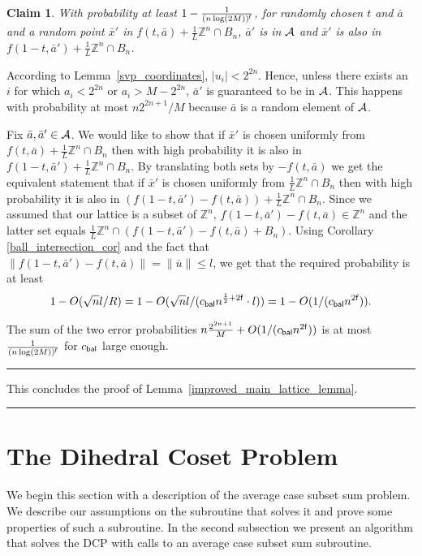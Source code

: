 \documentclass[11pt]{article}
\newtheorem{claim}[theorem]{Claim}
\newcommand{\qedsymb}{\hfill{\rule{2mm}{2mm}}}
\newenvironment{proof}{\begin{trivlist}
\item[\hspace{\labelsep}{\sl\noindent Proof:\/}]
}{\qedsymb\end{trivlist}}
\def\Z{\mathbb{Z}}
\newcommand\C[1]{{ c_{\sf {#1}} }}
\newcommand\alternate[2]{{#1}}
\begin{document}
\begin{proof}
\begin{claim}
With probability at least $1-\frac{1}{(n\log (2M))^{\sf f}}$, for randomly chosen $t$ and $\bar{a}$ and a random point
$\bar{x}'$ in $f(t,\bar{a})+\frac{1}{L}\Z^n \cap B_n$, $\bar{a}'$ is in ${\cal A}$ and $\bar{x}'$ is also in
$f(1-t,\bar{a}')+\frac{1}{L}\Z^n \cap B_n$.
\end{claim}
\begin{proof}
According to Lemma~\ref{svp_coordinates}, $|u_i| < 2^{2n}$. Hence, unless there exists an $i$ for which $a_i < 2^{2n}$
or $a_i > M-2^{2n}$, $\bar{a}'$ is guaranteed to be in ${\cal A}$. This happens with probability at most $n2^{2n+1}/M$
because $\bar{a}$ is a random element of ${\cal A}$.

Fix $\bar{a},\bar{a}' \in {\cal A}$. We would like to show that if $\bar{x}'$ is chosen uniformly from
$f(t,\bar{a})+\frac{1}{L}\Z^n \cap B_n$ then with high probability it is also in $f(1-t,\bar{a}')+\frac{1}{L}\Z^n \cap
B_n$. By translating both sets by $-f(t,\bar{a})$ we get the equivalent statement that if $\bar{x}'$ is chosen
uniformly from $\frac{1}{L}\Z^n \cap B_n$ then with high probability it is also in
$(f(1-t,\bar{a}')-f(t,\bar{a}))+\frac{1}{L}\Z^n \cap B_n$. Since we assumed that our lattice is a subset of $\Z^n$,
$f(1-t,\bar{a}')-f(t,\bar{a}) \in \Z^n$ and the latter set equals $\frac{1}{L}\Z^n \cap
(f(1-t,\bar{a}')-f(t,\bar{a})+B_n)$. Using Corollary \ref{ball_intersection_cor} and the fact that
$\|f(1-t,\bar{a}')-f(t,\bar{a})\| = \|\bar{u}\| \le l$, we get that the required probability is at least
$$1-O(\sqrt{n} l / R) = 1-O(\sqrt{n} l / (\C{bal}n^{\frac{1}{2}+2{\sf f}} \cdot l))
   = 1-O(1 / (\C{bal}n^{2{\sf f}})).$$

The sum of the two error probabilities $n\frac{2^{2n+1}}{M} + O(1 / (\C{bal}n^{2{\sf f}}))$ is at most $\frac{1}{(n\log
(2M))^{\sf f}}$ for $\C{bal}$ large enough.
\end{proof}

This concludes the proof of Lemma~\ref{improved_main_lattice_lemma}.
\end{proof}





\section{The Dihedral Coset Problem}
\label{section_two_point}

\alternate{We begin this section with a description of the average case subset sum problem. We describe our assumptions on the
subroutine that solves it and prove some properties of such a subroutine. In the second subsection we present an
algorithm that solves the DCP with calls to an average case subset sum subroutine.}{}
\end{document}
